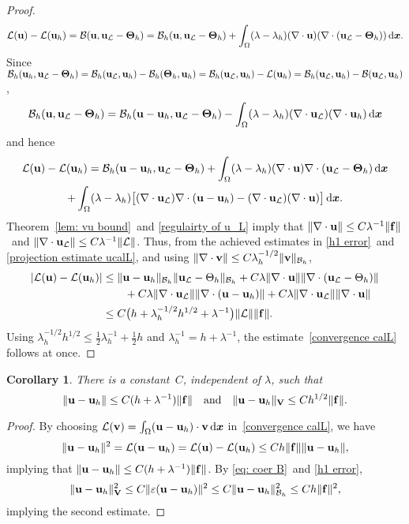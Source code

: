\documentclass[11pt]{article}
\newcommand{\calB}{\mathcal{B}}
\newcommand{\calL}{\mathcal{L}}
\newcommand{\vf}{{\bf f}}
\newcommand{\vu}{{\bf u}}
\newcommand{\vv}{{\bf v}}
\newcommand{\vV}{{\bf V}}
\newcommand{\bsx}{{\boldsymbol{x}}}
\numberwithin{equation}{section}
\newcommand{\ud}{\mathrm{d}}
\newtheorem{corollary}[theorem]{Corollary}
\begin{document}
\begin{proof}
\[
\calL(\vu)-\calL(\vu_h)=\calB(\vu,\vu_{\calL}-\mathbf{\Theta}_h)
    =\calB_h(\vu,\vu_{\calL}-{\bf\Theta}_h)
    +\int_{\Omega}(\lambda-\lambda_h)(\nabla\cdot\vu)
        (\nabla \cdot(\vu_{\calL}-\mathbf{\Theta}_h))\,\ud\bsx.
\]
Since $\calB_h(\vu_h,\vu_{\calL}-\mathbf{\Theta}_h)
=\calB_h(\vu_{\calL},\vu_h)-\calB_h(\mathbf{\Theta}_h,\vu_h)
=\calB_h(\vu_{\calL},\vu_h)-\calL(\vu_h)
=\calB_h(\vu_{\calL},\vu_h)-\calB(\vu_{\calL},\vu_h)$,
\[
\calB_h(\vu,\vu_{\calL}-{\bf\Theta}_h)
    =\calB_h(\vu-\vu_h,\vu_{\calL}-{\bf\Theta}_h)
    -\int_{\Omega} (\lambda-\lambda_h)
    (\nabla\cdot\vu_{\calL})(\nabla\cdot\vu_h)\,\ud\bsx
\]
and hence
\begin{multline}\label{change in lambda 2}
\calL(\vu)-\calL(\vu_h)
    =\calB_h(\vu-\vu_h,\vu_{\calL}-\mathbf{\Theta}_h)
+\int_{\Omega}(\lambda-\lambda_h)
    (\nabla\cdot\vu)\nabla\cdot(\vu_{\calL}-\mathbf{\Theta}_h)\,\ud\bsx\\
    +\int_{\Omega}(\lambda-\lambda_h)\bigl[
    (\nabla\cdot\vu_{\calL})\nabla\cdot(\vu-\vu_h)-
    (\nabla\cdot\vu_{\calL})(\nabla\cdot\vu)\bigr]\,\ud\bsx.
\end{multline}
Theorem~\ref{lem: vu bound}~and \eqref{regulairty of u_L} imply that
$\|\nabla\cdot\vu\|\le C\lambda^{-1}\|\vf\|$~and
$\|\nabla\cdot\vu_{\calL}\|\le C\lambda^{-1}\|\calL\|$. Thus, from the achieved
estimates in \eqref{h1 error}~and \eqref{projection estimate ucalL}, and
using $\|\nabla\cdot\vv\|\le C\lambda_h^{-1/2}\|\vv\|_{\calB_h}$,
\begin{align*}
|\calL(\vu)-\calL(\vu_h)|
    &\le\|\vu-\vu_h\|_{\calB_h}\|\vu_{\calL}-\Theta_h\|_{\calB_h}
    +C\lambda \|\nabla \cdot\vu\|\|\nabla\cdot(\vu_{\calL}-\Theta_h)\|\\
    &\qquad{}+C\lambda\|\nabla\cdot\vu_{\calL}\|\|\nabla\cdot(\vu-\vu_h)\|
        +C\lambda\|\nabla \cdot \vu_{\calL}\|\| \nabla \cdot\vu\|\\
    &\le C\bigr(h+\lambda_h^{-1/2}h^{1/2}+\lambda^{-1}\bigr)
        \|\calL\|\|\vf\|.
\end{align*}
Using $\lambda_h^{-1/2}h^{1/2}\le\frac12\lambda_h^{-1}+\tfrac12h$ and
$\lambda_h^{-1}=h+\lambda^{-1}$, the estimate~\eqref{convergence calL}
follows at once.
\end{proof}

\begin{corollary}\label{cor: L2 H1 errors}
There is a constant~$C$, independent of $\lambda$, such that
\[
\|\vu-\vu_h\|\le C(h+\lambda^{-1})\|\vf\|
\quad\text{and}\quad\|\vu-\vu_h\|_{\vV}\le Ch^{1/2}\|\vf\|.
\]
\end{corollary}
\begin{proof}
By choosing 
$\calL(\vv)=\int_\Omega(\vu-\vu_h)\cdot \vv\,\ud\bsx$ in~\eqref{convergence calL}, we have
\[
\|\vu-\vu_h\|^2=\calL(\vu-\vu_h)=\calL(\vu)-\calL(\vu_h)\le Ch\|\vf\|\|\vu-\vu_h\|,
\]
implying that $\|\vu-\vu_h\|\le C(h+\lambda^{-1})\|\vf\|$.  By
\eqref{eq: coer B}~and \eqref{h1 error},
\[
\|\vu-\vu_h\|_{\vV}^2\le C\|\varepsilon(\vu-\vu_h)\|^2
\le C\|\vu-\vu_h\|_{\calB_h}^2\le Ch\|\vf\|^2,
\]
implying the second estimate.
\end{proof}
\end{document}
